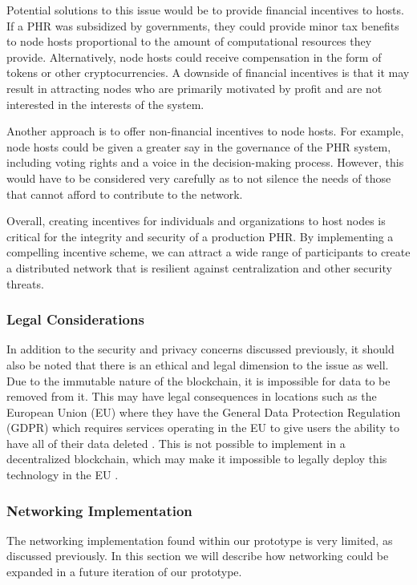 \documentclass{article}
\begin{document}
Potential solutions to this issue would be to provide financial incentives to hosts. If a PHR was subsidized by governments, they could provide minor tax benefits to node hosts proportional to the amount of computational resources they provide. Alternatively, node hosts could receive compensation in the form of tokens or other cryptocurrencies. A downside of financial incentives is that it may result in attracting nodes who are primarily motivated by profit and are not interested in the interests of the system.

Another approach is to offer non-financial incentives to node hosts. For example, node hosts could be given a greater say in the governance of the PHR system, including voting rights and a voice in the decision-making process. However, this would have to be considered very carefully as to not silence the needs of those that cannot afford to contribute to the network.

Overall, creating incentives for individuals and organizations to host nodes is critical for the integrity and security of a production PHR. By implementing a compelling incentive scheme, we can attract a wide range of participants to create a distributed network that is resilient against centralization and other security threats.  

\subsubsection{Legal Considerations}
In addition to the security and privacy concerns discussed previously, it should also be noted that there is an ethical and legal dimension to the issue as well. Due to the immutable nature of the blockchain, it is impossible for data to be removed from it. This may have legal consequences in locations such as the European Union (EU) where they have the General Data Protection Regulation (GDPR) which requires services operating in the EU to give users the ability to have all of their data deleted \cite{GDPR-Art17}. This is not possible to implement in a decentralized blockchain, which may make it impossible to legally deploy this technology in the EU \cite{info:doi/10.2196/25094}.

\subsubsection{Networking Implementation}
\label{improvements:networking}
The networking implementation found within our prototype is very limited, as discussed previously. In this section we will describe how networking could be expanded in a future iteration of our prototype.
\end{document}
